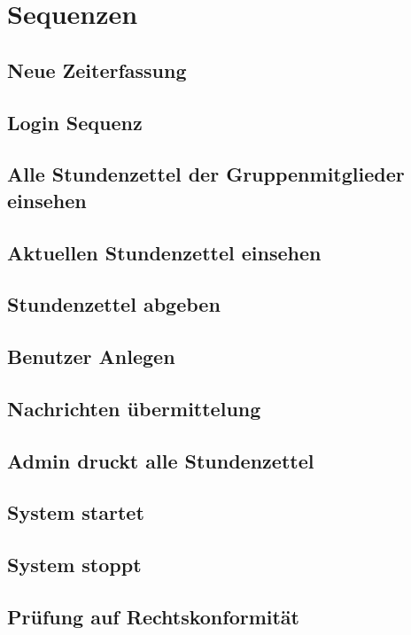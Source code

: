 \section{Sequenzen}
    \subsection{Neue Zeiterfassung}
    \subsection{Login Sequenz}
    \subsection{Alle Stundenzettel der Gruppenmitglieder einsehen}
    \subsection{Aktuellen Stundenzettel einsehen}
    \subsection{Stundenzettel abgeben}
    \subsection{Benutzer Anlegen}
    \subsection{Nachrichten übermittelung}
    \subsection{Admin druckt alle Stundenzettel}
    \subsection{System startet}
    \subsection{System stoppt}
    \subsection{Prüfung auf Rechtskonformität}